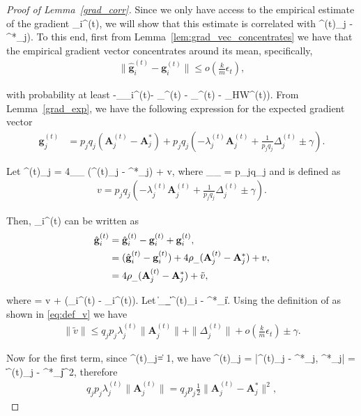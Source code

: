 \documentclass{article}
\newcommand{\HT}{{\c{T}}}
\newcommand{\gradvec}{\b{g}_i}
\def\[#1\]{{$#1$}}
\def\b#1{{\mathbf{#1}}}
\def\c#1{{\mathcal{#1}}}
\begin{document}
\begin{proof}[Proof of Lemma~\ref{grad_corr}]
	Since we only have access to the empirical estimate of the gradient \[\hat{\b{g}}_i^{(t)}\], we will show that this estimate is correlated with \[(\b{A}^{(t)}_j - \b{A}^*_j)\]. To this end, first from Lemma~\ref{lem:grad_vec_concentrates} we have that the empirical gradient vector concentrates around its mean, specifically,
	\begin{align*}
	\|\hat{\b{g}}_i^{(t)} - \b{g}_i^{(t)}\| \leq o(\tfrac{k}{m}\epsilon_t),
	\end{align*}
	
	with probability at least \[(1 -\delta_{\gradvec}^{(t)}- \delta_{\beta}^{(t)} - \delta_{\HT}^{(t)} - \delta_{\rm HW}^{(t)})\]. From Lemma~\ref{grad_exp}, we have the following expression for the expected gradient vector
		\begin{align*}
		\b{g}^{(t)}_j
		&=  p_jq_j (\b{A}^{(t)}_j- \b{A}^*_j)  +  p_jq_j(- \lambda^{(t)}_j\b{A}^{(t)}_j+ \tfrac{1}{ p_jq_j}\Delta^{(t)}_j \pm \gamma).
		\end{align*}
		
		Let \[\b{g}^{(t)}_j = 4\rho_{\_} (\b{A}^{(t)}_j - \b{A}^*_j) + v\], where \[4\rho_{\_} = p_jq_j\] and \[v\] is defined as
		\begin{align}\label{eq:def_v}
		v =  p_jq_j(- \lambda^{(t)}_{j}\b{A}^{(t)}_j+ \tfrac{1}{ p_jq_j}\Delta^{(t)}_j \pm \gamma).
		\end{align}
		
		Then, \[\hat{\b{g}}_i^{(t)} \] can be written as
	\begin{align}\label{eq:grad_hat_decomp}
	\hat{\b{g}}_i^{(t)}  &= \hat{\b{g}}_i^{(t)} - \b{g}_i^{(t)} + \b{g}_i^{(t)},\notag \\
	& = (\hat{\b{g}}_i^{(t)} - \b{g}_i^{(t)}) + 4\rho_{\_} (\b{A}^{(t)}_j - \b{A}^*_j) + v, \notag \\
	& = 4\rho_{\_} (\b{A}^{(t)}_j - \b{A}^*_j) + \tilde{v},
	\end{align}
	
	where \[\tilde{v} = v + (\hat{\b{g}}_i^{(t)} - \b{g}_i^{(t)})\]. Let  \[\|\| \leq \rho_{\_}\|\b{A}^{(t)}_i - \b{A}^*_i\| \]. Using the definition of \[v\] as shown in \eqref{eq:def_v} we have
	\begin{align*}
	\|\tilde{v}\| \leq q_j p_j\lambda^{(t)}_{j}\|\b{A}^{(t)}_j\|+ \|\Delta^{(t)}_j\| + o(\tfrac{k}{m}\epsilon_t) \pm \gamma.
	\end{align*}
	
		Now for the first term, since \[\|\b{A}^{(t)}_j\| = 1\], we have \[\lambda^{(t)}_{j} = |\langle \b{A}^{(t)}_j - \b{A}^{*}_j, \b{A}^*_j\rangle| = \| \b{A}^{(t)}_j - \b{A}^{*}_j\|^2\], therefore
		\begin{align*}
		q_j p_j\lambda^{(t)}_{j}\|\b{A}^{(t)}_j\| = q_j p_j\tfrac{1}{2}\| \b{A}^{(t)}_j - \b{A}^{*}_j\|^2,
		

\end{align*}
\end{proof}
\end{document}
